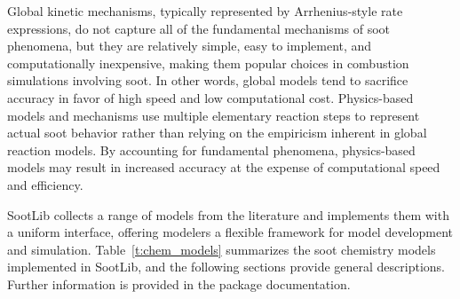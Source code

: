 \documentclass[preprint,letterpaper]{elsarticle}
\begin{document}
Global kinetic mechanisms, typically represented by Arrhenius-style rate expressions, do not capture all of the fundamental mechanisms of soot phenomena, but they are relatively simple, easy to implement, and computationally inexpensive, making them popular choices in combustion simulations involving soot.
In other words, global models tend to sacrifice accuracy in favor of high speed and low computational cost.
Physics-based models and mechanisms use multiple elementary reaction steps to represent actual soot behavior rather than relying on the empiricism inherent in global reaction models.
By accounting for fundamental phenomena, physics-based models may result in increased accuracy at the expense of computational speed and efficiency.

SootLib collects a range of models from the literature and implements them with a uniform interface, offering modelers a flexible framework for model development and simulation. Table~\ref{t:chem_models} summarizes the soot chemistry models implemented in SootLib, and the following sections provide general descriptions. Further information is provided in the package documentation.
\end{document}
